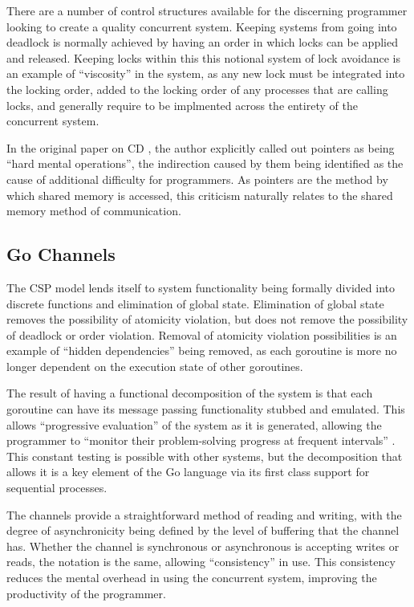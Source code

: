 \documentclass{sig-alternate}
\begin{document}
There are a number of control structures available for the discerning
programmer looking to create a quality concurrent system. Keeping
systems from going into deadlock is normally achieved by having an
order in which locks can be applied and released. Keeping locks within
this this notional system of lock avoidance is an example of
``viscosity'' in the system, as any new lock must be integrated into
the locking order, added to the locking order of any processes that
are calling locks, and generally require to be implmented across the
entirety of the concurrent system.

In the original paper on CD \cite{enpl}, the author explicitly called
out pointers as being ``hard mental operations'', the indirection
caused by them being identified as the cause of additional difficulty
for programmers. As pointers are the method by which shared memory is
accessed, this criticism naturally relates to the shared memory method
of communication.

\subsection{Go Channels}
The CSP model lends itself to system functionality being formally
divided into discrete functions and elimination of global state.
Elimination of global state removes the possibility of atomicity
violation, but does not remove the possibility of deadlock or order
violation. Removal of atomicity violation possibilities is an example
of ``hidden dependencies'' being removed, as each goroutine is more no
longer dependent on the execution state of other goroutines.

The result of having a functional decomposition of the system is that
each goroutine can have its message passing functionality stubbed and
emulated. This allows ``progressive evaluation'' of the system as it
is generated, allowing the programmer to ``monitor their
problem-solving progress at frequent intervals'' \cite{enpl}. This
constant testing is possible with other systems, but the decomposition
that allows it is a key element of the Go language via its first class
support for sequential processes.

The channels provide a straightforward method of reading and writing,
with the degree of asynchronicity being defined by the level of
buffering that the channel has. Whether the channel is synchronous or
asynchronous is accepting writes or reads, the notation is the same,
allowing ``consistency'' in use. This consistency reduces the mental
overhead in using the concurrent system, improving the productivity of
the programmer.
\end{document}
